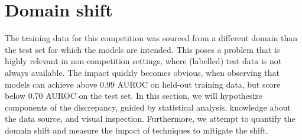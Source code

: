 \section{Domain shift} \label{domain-shift}
The training data for this competition was sourced from a different domain than the test set for which the models are intended. This poses a problem that is highly relevant in non-competition settings, where (labelled) test data is not always available. The impact quickly becomes obvious, when observing that models can achieve above $0.99$ AUROC on held-out training data, but score below $0.70$ AUROC on the test set. In this section, we will hypothesize components of the discrepancy, guided by statistical analysis, knowledge about the data source, and visual inspection. Furthermore, we attempt to quantify the domain shift and measure the impact of techniques to mitigate the shift.

